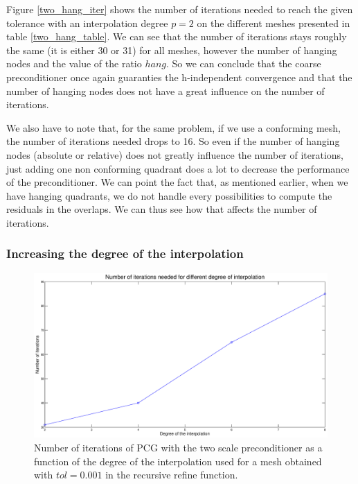 Figure \ref{two_hang_iter} shows the number of iterations needed to reach the given tolerance with an interpolation degree $p=2$ on the different meshes presented in table \ref{two_hang_table}. We can see that the number of iterations stays roughly the same (it is either 30 or 31) for all meshes, however the number of hanging nodes and the value of the ratio $hang$. So we can conclude that the coarse preconditioner once again guaranties the h-independent convergence and that the number of hanging nodes does not have a great influence on the number of iterations. 

We also have to note that, for the same problem, if we use a conforming mesh, the number of iterations needed drops to 16. So even if the number of hanging nodes (absolute or relative) does not greatly influence the number of iterations, just adding one non conforming quadrant does a lot to decrease the performance of the preconditioner. We can point the fact that, as mentioned earlier, when we have hanging quadrants, we do not handle every possibilities to compute the residuals in the overlaps. We can thus see how that affects the number of iterations. 


\subsubsection{Increasing the degree of the interpolation}

\begin{figure}
\centering
\includegraphics[scale=0.35]{Results/two_hang_deg.eps}
\caption{Number of iterations of PCG with the two scale preconditioner as a function of the degree of the interpolation used for a mesh obtained with $tol = 0.001$ in the recursive refine function.}
\label{two_hang_deg}
\end{figure}

